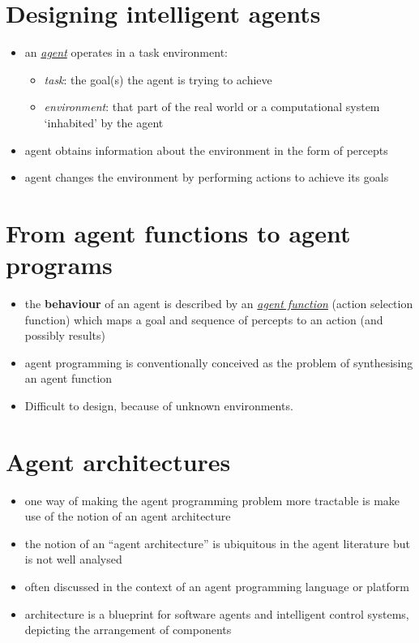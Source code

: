 \documentclass{article}
\newcommand{\worddef}[1]{\hyperref[sec:reference]{\textit{#1}}}
\begin{document}
\tableofcontents

\newpage

\section{Designing intelligent agents}
\begin{itemize}
  \item an \worddef{agent} operates in a task environment:
  \begin{itemize}
    \item \textit{task}: the goal(s) the agent is trying to achieve
    \item \textit{environment}: that part of the real world or a computational system ‘inhabited’ by the agent 
  \end{itemize}
  \item agent obtains information about the environment in the form of percepts 
  \item agent changes the environment by performing actions to achieve its goals
\end{itemize}

\section{From agent functions to agent programs}

\begin{itemize}
  \item the \textbf{behaviour} of an agent is described by an \worddef{agent function} (action selection function) which maps a goal and sequence of percepts to an action (and possibly results)
  \item agent programming is conventionally conceived as the problem of
synthesising an agent function
  \item  Difficult to design, because of unknown environments.
\end{itemize}

\section{Agent architectures}

\begin{itemize}
  \item one way of making the agent programming problem more tractable is make use of the notion of an agent architecture 
  \item the notion of an “agent architecture” is ubiquitous in the agent literature but is not well analysed 
  \item often discussed in the context of an agent programming language or platform 
  \item architecture is a blueprint for software agents and intelligent control systems, depicting the arrangement of components
\end{itemize}
\end{document}
